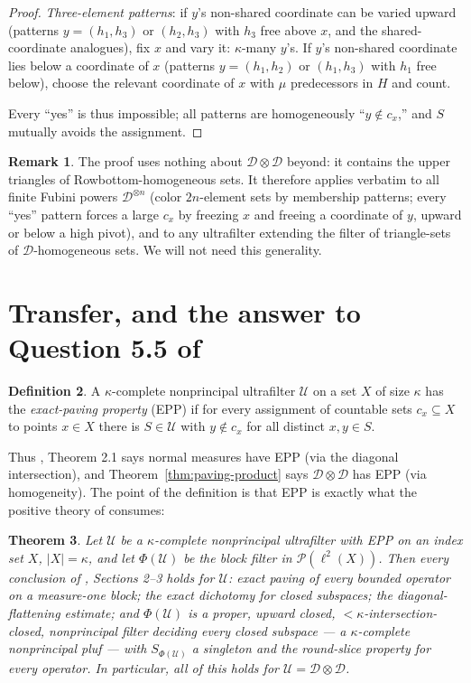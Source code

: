 \documentclass[11pt]{article}
\newtheorem{theorem}{Theorem}[section]
\theoremstyle{definition}
\newtheorem{definition}[theorem]{Definition}
\newtheorem{remark}[theorem]{Remark}
\newcommand{\PP}{\mathcal{P}}
\newcommand{\U}{\mathcal{U}}
\newcommand{\D}{\mathcal{D}}
\begin{document}
\begin{proof}
\emph{Three-element patterns}: if $y$'s non-shared coordinate can be
varied upward (patterns $y=(h_1,h_3)$ or $(h_2,h_3)$ with $h_3$ free
above $x$, and the shared-coordinate analogues), fix $x$ and vary it:
$\kappa$-many $y$'s. If $y$'s non-shared coordinate lies below a
coordinate of $x$ (patterns $y=(h_1,h_2)$ or $(h_1,h_3)$ with $h_1$ free
below), choose the relevant coordinate of $x$ with $\mu$ predecessors in
$H$ and count.

Every ``yes'' is thus impossible; all patterns are homogeneously
``$y\notin c_x$,'' and $S$ mutually avoids the assignment.
\end{proof}

\begin{remark}
The proof uses nothing about $\D\otimes\D$ beyond: it contains the upper
triangles of Rowbottom-homogeneous sets. It therefore applies verbatim to
all finite Fubini powers $\D^{\otimes n}$ (color $2n$-element sets by
membership patterns; every ``yes'' pattern forces a large $c_x$ by
freezing $x$ and freeing a coordinate of $y$, upward or below a
high pivot), and to any ultrafilter extending the filter of triangle-sets
of $\D$-homogeneous sets. We will not need this generality.
\end{remark}

\section{Transfer, and the answer to Question 5.5 of \cite{FWIII}}
\label{sec:transfer}

\begin{definition}\label{def:EPP}
A $\kappa$-complete nonprincipal ultrafilter $\U$ on a set $X$ of size
$\kappa$ has the \emph{exact-paving property} (EPP) if for every
assignment of countable sets $c_x\subseteq X$ to points $x\in X$ there is
$S\in\U$ with $y\notin c_x$ for all distinct $x,y\in S$.
\end{definition}

Thus \cite{FWIII}, Theorem 2.1 says normal measures have EPP (via the
diagonal intersection), and Theorem~\ref{thm:paving-product} says
$\D\otimes\D$ has EPP (via homogeneity). The point of the definition is
that EPP is exactly what the positive theory of \cite{FWIII} consumes:

\begin{theorem}\label{thm:main}
Let $\U$ be a $\kappa$-complete nonprincipal ultrafilter with EPP on an
index set $X$, $|X|=\kappa$, and let $\Phi(\U)$ be the block filter in
$\PP(\ell^2(X))$. Then every conclusion of \cite{FWIII}, Sections 2--3
holds for $\U$: exact paving of every bounded operator on a measure-one
block; the exact dichotomy for closed subspaces; the diagonal-flattening
estimate; and $\Phi(\U)$ is a proper, upward closed,
${<}\kappa$-intersection-closed, nonprincipal filter deciding every closed
subspace --- a $\kappa$-complete nonprincipal pluf --- with
$S_{\Phi(\U)}$ a singleton and the round-slice property for every
operator. In particular, all of this holds for $\U=\D\otimes\D$.
\end{theorem}
\end{document}
